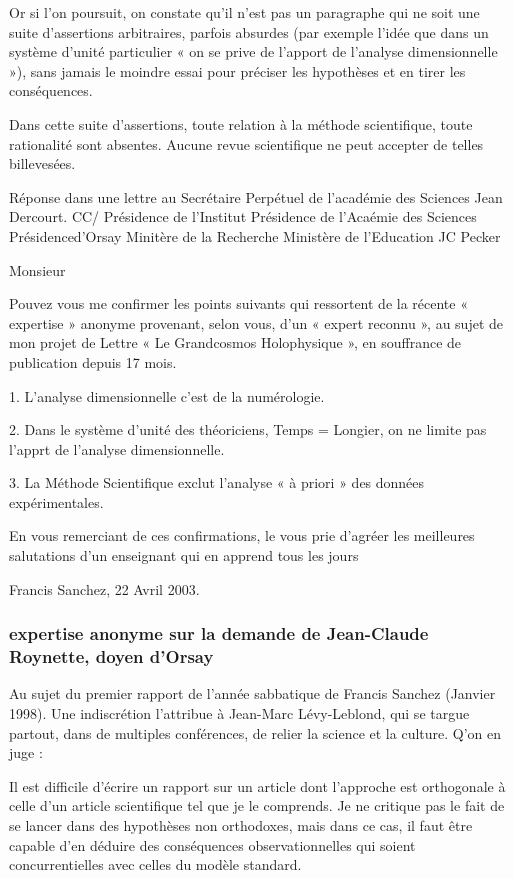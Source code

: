 \documentclass[a4paper,12pt]{article}
\begin{document}
Or si l’on poursuit, on constate qu’il n’est pas un paragraphe qui ne soit une suite d’assertions arbitraires, parfois absurdes (par exemple l’idée que dans un système d’unité particulier « on se prive de l’apport de l’analyse dimensionnelle »), sans jamais le moindre essai pour préciser les hypothèses et en tirer les conséquences.

Dans cette suite d’assertions, toute relation à la méthode scientifique, toute rationalité sont absentes. Aucune revue scientifique ne peut accepter de telles billevesées.



Réponse dans une lettre au Secrétaire Perpétuel de l’académie des Sciences Jean Dercourt.
CC/ Présidence de l’Institut
Présidence de l’Acaémie des Sciences
Présidenced’Orsay
Minitère de la Recherche
Ministère de l’Education
JC Pecker

Monsieur

Pouvez vous me confirmer les points suivants qui ressortent de la récente « expertise » anonyme provenant, selon vous, d’un « expert reconnu », au sujet de mon projet de Lettre « Le Grandcosmos Holophysique », en souffrance de publication depuis 17 mois.

1. L’analyse dimensionnelle c’est de la numérologie.

2. Dans le système d’unité des théoriciens,  Temps = Longier, on ne limite pas l’apprt de l’analyse dimensionnelle.

3. La Méthode Scientifique exclut l’analyse « à priori » des données expérimentales.

En vous remerciant de ces confirmations, le vous prie d’agréer les meilleures salutations d’un enseignant qui en apprend tous les jours

Francis Sanchez, 22 Avril 2003.


\subsubsection{expertise anonyme sur la demande de Jean-Claude Roynette, doyen d’Orsay} 

Au sujet du premier rapport de l’année sabbatique de Francis Sanchez (Janvier 1998). Une indiscrétion l’attribue à Jean-Marc Lévy-Leblond, qui se targue partout, dans de multiples conférences, de relier la science et la culture. Q’on en juge :

Il est difficile d’écrire un rapport sur un article dont l’approche est orthogonale à celle d’un article scientifique tel que je le comprends. Je ne critique pas le fait de se lancer dans des hypothèses non orthodoxes, mais dans ce cas, il faut être capable d’en déduire des conséquences observationnelles qui soient concurrentielles avec celles du modèle standard.
\end{document}
